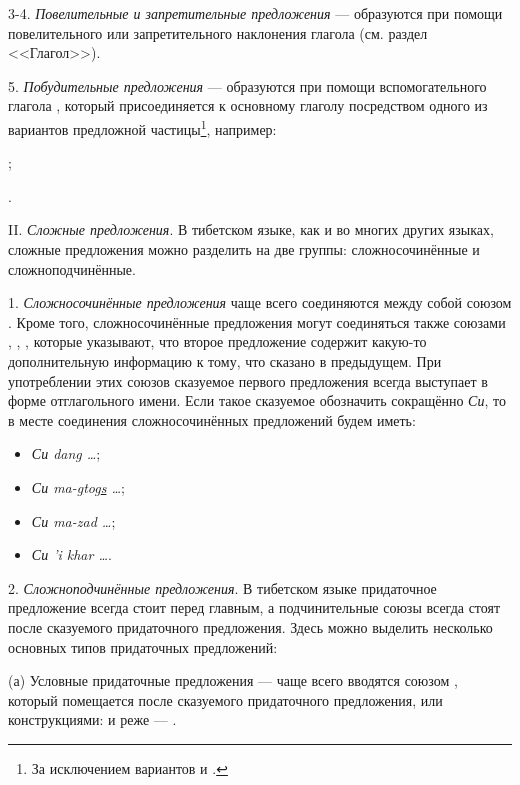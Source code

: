 3-4. \emph{Повелительные и запретительные предложения} --- образуются при помощи повелительного или запретительного наклонения глагола (см. раздел <<Глагол>>).

5. \emph{Побудительные предложения} --- образуются при помощи вспомогательного глагола , который присоединяется к основному глаголу посредством одного из вариантов предложной частицы\footnote[53]{За исключением вариантов  и .}, например:
\begin{prfsample}
	\item {};
	\item {}.
\end{prfsample}

II. \emph{Сложные предложения}. В тибетском языке, как и во многих других языках, сложные предложения можно разделить на две группы: сложносочинённые и сложноподчинённые.

1. \emph{Сложносочинённые предложения} чаще всего соединяются между собой союзом . Кроме того, сложносочинённые предложения могут соединяться также союзами , , , которые указывают, что второе предложение содержит какую-то дополнительную информацию к тому, что сказано в предыдущем. При употреблении этих союзов сказуемое первого предложения всегда выступает в форме отглагольного имени. Если такое сказуемое обозначить сокращённо \emph{Си}, то в месте соединения сложносочинённых предложений будем иметь:
\begin{itemize}
	\item \emph{Си dang \ldots{}};
	\item \emph{Си ma-\ul{g}tog\ul{s} \ldots{}};
	\item \emph{Си ma-zad \ldots{}};
	\item \emph{Си 'i khar \ldots{}}.
\end{itemize}

2. \emph{Сложноподчинённые предложения}. В тибетском языке придаточное предложение всегда стоит перед главным, а подчинительные союзы всегда стоят после сказуемого придаточного предложения. Здесь можно выделить несколько основных типов придаточных предложений:

(а)	Условные придаточные предложения --- чаще всего вводятся союзом , который помещается после сказуемого придаточного предложения, или конструкциями:
 и реже --- .

